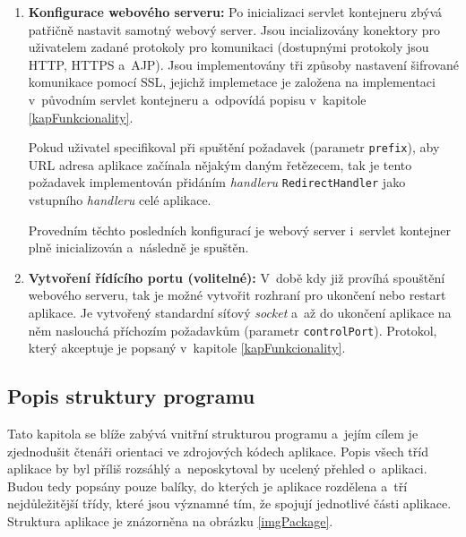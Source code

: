 \begin{enumerate}
                
                \item \textbf{Konfigurace webového serveru:} 
                    Po inicializaci servlet kontejneru zbývá patřičně nastavit 
                    samotný webový server. Jsou incializovány konektory pro uživatelem zadané
                    protokoly pro komunikaci (dostupnými protokoly jsou HTTP, HTTPS a~AJP). 
                    Jsou implementovány tři způsoby nastavení šifrované komunikace pomocí SSL, jejichž 
                    implemetace je založena na implementaci v~původním servlet kontejneru
                    a~odpovídá popisu v~kapitole \ref{kapFunkcionality}.
                    
                    Pokud uživatel specifikoval při spuštění požadavek (parametr \texttt{prefix}), 
                    aby  URL adresa aplikace začínala 
                    nějakým daným řetězecem, tak je tento požadavek implementován
                    přidáním \emph{handleru} \texttt{RedirectHandler} jako vstupního \emph{handleru}
                    celé aplikace.

                    Provedním těchto posledních konfigurací je webový server i~servlet kontejner
                    plně inicializován a~následně je spuštěn.
                
                \item \textbf{Vytvoření řídícího portu (volitelné):} 
                    V~době kdy již províhá spouštění webového serveru, 
                    tak je možné vytvořit rozhraní pro ukončení nebo restart aplikace.
                    Je vytvořený standardní síťový \emph{socket} a~až do ukončení aplikace
                    na něm naslouchá příchozím požadavkům (parametr \texttt{controlPort}). Protokol, který akceptuje je popsaný
                    v~kapitole \ref{kapFunkcionality}.

            \end{enumerate}




        \subsection{Popis struktury programu}
            Tato kapitola se blíže zabývá vnitřní strukturou programu a~jejím cílem je zjednodušit 
            čtenáři orientaci ve zdrojových kódech aplikace.
            Popis všech tříd aplikace by byl příliš rozsáhlý a~neposkytoval by ucelený přehled o~aplikaci.
            Budou tedy popsány pouze balíky, do kterých je aplikace rozdělena
            a~tří nejdůležitější třídy, které jsou významné tím, že spojují jednotlivé části aplikace.
            Struktura aplikace je znázorněna na obrázku \ref{imgPackage}.
                    
